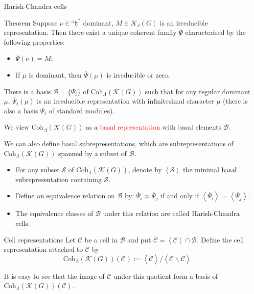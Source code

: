 \documentclass[fleqn,xcolor=dvipsnames]{beamer}
\newcommand{\CB}{{\mathcal {B}}}
\newcommand{\CC}{{\mathcal {C}}}
\newcommand{\CK}{{\mathcal {K}}}
\newcommand{\CS}{{\mathcal {S}}}
\newcommand{\fh}{\mathfrak{h}}
\renewcommand{\bar}{\overline}
\begin{document}
\begin{frame}{Harish-Chandra cells}
  \begin{block}{Theorem}
    Suppose $\nu \in {^{a}\fh}^*$ dominant, $M \in \CK_{\nu}(G)$ is an irreducible representation. Then there exist a unique coherent family $\bar{\Psi}$ characterised by the following properties:
    \begin{itemize}
      \item $\bar{\Psi}(\nu) = M$;
      \item If $\mu$ is dominant, then $\bar{\Psi}(\mu)$ is irreducible or zero.
    \end{itemize}
  \end{block}
   There is a basis $\CB = \{\bar{\Psi}_i\}$ of $\mathrm{Coh}_{\Lambda}(\CK(G))$ such that for any regular dominant $\mu$, $\bar{\Psi}_i(\mu)$ is an irreducible representation with infinitesimal character $\mu$ (there is also a basis $\Psi_i$ of standard modules).\par
   We view $\mathrm{Coh}_{\Lambda}(\CK(G))$ as a \textcolor{red}{basal representation} with basal elements $\CB$.\par
   We can also define basal subrepresentations, which are subrepresentations of $\mathrm{Coh}_{\Lambda}(\CK(G))$ spanned by a subset of $\CB$. 
\end{frame}






\begin{frame}
  \begin{itemize}
    \item For any subset $\CS$ of $\mathrm{Coh}_{\Lambda}(\CK(G))$, denote by $\left \langle \CS \right \rangle$ the minimal basal subrepresentation containing $\CS$.
    \item Define an equivalence relation on $\CB$ by: 
    $\bar{\Psi}_i \approx  \bar{\Psi}_j$ if and only if $\left \langle \bar{\Psi}_i \right \rangle = \left \langle \bar{\Psi}_j \right \rangle$.
    \item The equivalence classes of $\CB$ under this relation are called Harish-Chandra cells.
  \end{itemize}
  
  
  
  \begin{block}{Cell representations}
    Let $\CC$ be a cell in $\CB$ and put $\bar{\CC} = \left \langle \CC \right \rangle \cap \CB$. Define the cell representation attached to $\CC$ by
    \[ \mathrm{Coh}_{\Lambda}(\CK(G))(\CC) := \left \langle \bar{\CC} \right \rangle  / \left \langle \bar{\CC} \backslash \CC \right \rangle\] 
  \end{block}

 It is easy to see that the image of $\CC$ under this quotient form a basis of $\mathrm{Coh}_{\Lambda}(\CK(G))(\CC)$.
  
\end{frame}
\end{document}
